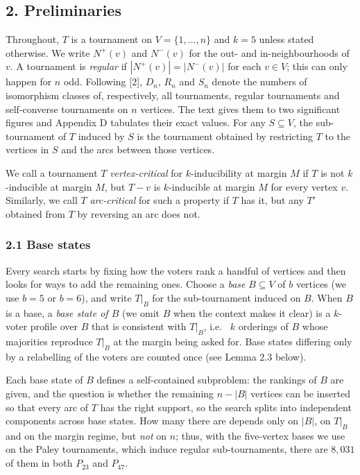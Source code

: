 \documentclass[
]{article}
\begin{document}
\subsection{2. Preliminaries}\label{preliminaries}

Throughout, \(T\) is a tournament on \(V = \{1, \dots, n\}\) and
\(k = 5\) unless stated otherwise. We write \(N^{+}(v)\) and
\(N^{-}(v)\) for the out- and in-neighbourhoods of \(v\). A tournament
is \emph{regular} if \(|N^{+}(v)| = |N^{-}(v)|\) for each \(v \in V\);
this can only happen for \(n\) odd. Following {[}2{]}, \(D_n\), \(R_n\)
and \(S_n\) denote the numbers of isomorphism classes of, respectively,
all tournaments, regular tournaments and self-converse tournaments on
\(n\) vertices. The text gives them to two significant figures and
Appendix D tabulates their exact values. For any \(S \subseteq V\), the
sub-tournament of \(T\) induced by \(S\) is the tournament obtained by
restricting \(T\) to the vertices in \(S\) and the arcs between those
vertices.

We call a tournament \(T\) \emph{vertex-critical} for \(k\)-inducibility
at margin \(M\) if \(T\) is not \(k\)-inducible at margin \(M\), but
\(T - v\) is \(k\)-inducible at margin \(M\) for every vertex \(v\).
Similarly, we call \(T\) \emph{arc-critical} for such a property if
\(T\) has it, but any \(T'\) obtained from \(T\) by reversing an arc
does not.

\subsubsection{2.1 Base states}\label{base-states}

Every search starts by fixing how the voters rank a handful of vertices
and then looks for ways to add the remaining ones. Choose a \emph{base}
\(B \subseteq V\) of \(b\) vertices (we use \(b = 5\) or \(b = 6\)), and
write \(T|_B\) for the sub-tournament induced on \(B\). When \(B\) is a
base, a \emph{base state of \(B\)} (we omit \(B\) when the context makes
it clear) is a \(k\)-voter profile over \(B\) that is consistent with
\(T|_B\), i.e.~ \(k\) orderings of \(B\) whose majorities reproduce
\(T|_B\) at the margin being asked for. Base states differing only by a
relabelling of the voters are counted once (see Lemma 2.3 below).

Each base state of \(B\) defines a self-contained subproblem: the
rankings of \(B\) are given, and the question is whether the remaining
\(n - |B|\) vertices can be inserted so that every arc of \(T\) has the
right support, so the search splits into independent components across
base states. How many there are depends only on \(|B|\), on \(T|_B\) and
on the margin regime, but \emph{not} on \(n\); thus, with the
five-vertex bases we use on the Paley tournaments, which induce regular
sub-tournaments, there are \(8{,}031\) of them in both \(P_{23}\) and
\(P_{47}\).
\end{document}
